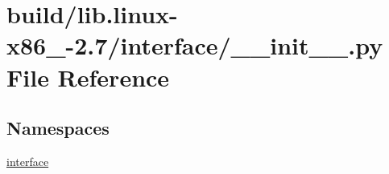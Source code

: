\hypertarget{build_2lib_8linux-x86__64-2_87_2interface_2____init_____8py}{}\section{build/lib.linux-\/x86\+\_-\/2.7/interface/\+\_\+\+\_\+init\+\_\+\+\_\+.py File Reference}
\label{build_2lib_8linux-x86__64-2_87_2interface_2____init_____8py}
\subsection*{Namespaces}
\begin{DoxyCompactItemize}
\item 
 \hyperlink{namespaceinterface}{interface}
\end{DoxyCompactItemize}

